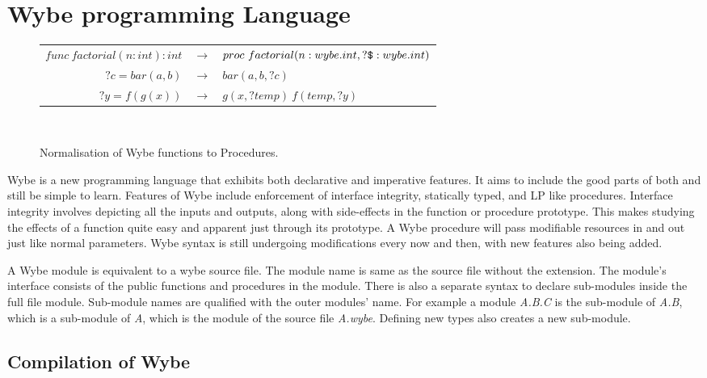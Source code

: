 \chapter{Wybe programming Language}


\begin{figure}
\centering
\begin{tabular}{r c l}

\( func\ factorial(n:int):int \) & \(\rightarrow \) & 
\( proc\ factorial(n:wybe.int, ?\verb+$+:wybe.int) \) \\
\( ?c = bar(a, b) \) & \(\rightarrow\) & \( bar(a, b, ?c) \) \\
\( ?y = f(g(x)) \) & \(\rightarrow\) & \( g(x, ?temp)\ f(temp, ?y) \) \\


\end{tabular}
\\
\caption{Normalisation of Wybe functions to Procedures.}
\label{fig:wybe_convert_to_proc}
\end{figure}



Wybe is a new programming language that exhibits both declarative and
imperative features. It aims to include the good parts of both and still be
simple to learn. Features of Wybe include enforcement of interface integrity,
statically typed, and LP like procedures. Interface integrity involves
depicting all the inputs and outputs, along with side-effects in the function
or procedure prototype. This makes studying the effects of a function quite
easy and apparent just through its prototype. A Wybe procedure will pass
modifiable resources in and out just like normal parameters. Wybe syntax is
still undergoing modifications every now and then, with new features also being
added. 

A Wybe module is equivalent to a wybe source file. The module name is same as
the source file without the extension. The module's interface consists of the
public functions and procedures in the module. There is also a separate syntax
to declare sub-modules inside the full file module. Sub-module names are
qualified with the outer modules' name. For example a module \textit{A.B.C} is
the sub-module of \textit{A.B}, which is a sub-module of \textit{A}, which is
the module of the source file \textit{A.wybe}. Defining new types also creates
a new sub-module. 





\section{Compilation of Wybe}

